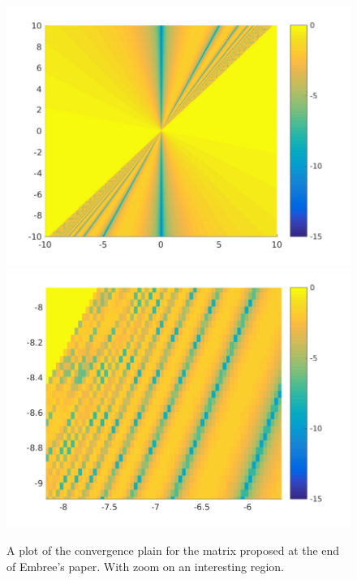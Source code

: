 \begin{figure}
\centering
\includegraphics[width=0.45\linewidth]{../src/figure/twoDPaper}
\includegraphics[width=0.45\linewidth]{../src/figure/twoDZoom}
\caption{A plot of the convergence plain for the matrix proposed at the end of Embree's paper. With zoom on an interesting region.}
\label{fig:twoDZoom}
\end{figure}





